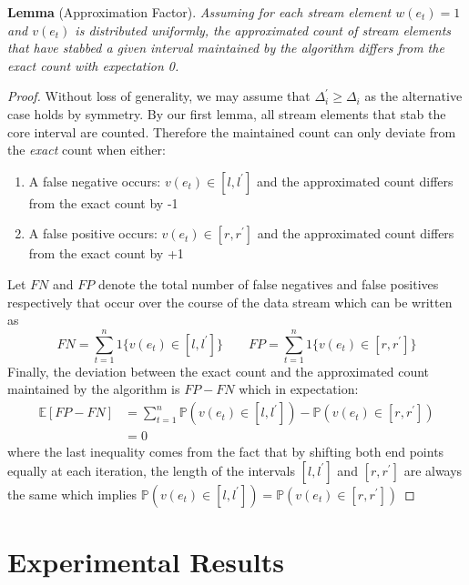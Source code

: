 \textbf{Lemma} (Approximation Factor). \textit{Assuming for each stream element $w(e_t)=1$ and $v(e_t)$ is distributed uniformly, the approximated count of stream elements that have stabbed a given interval maintained by the algorithm differs from the exact count with expectation 0.} 
\\
\begin{proof}
    Without loss of generality, we may assume that $\Delta_i^\prime \geq \Delta_i$ as the alternative case holds by symmetry. 
    By our first lemma, all stream elements that stab the core interval are counted. Therefore the maintained count can only deviate from the \textit{exact} count when either: 
    \begin{enumerate}
        \item A false negative occurs: $v(e_t) \in [l, l^\prime]$ and the approximated count differs from the exact count by -1
        \item A false positive occurs: $v(e_t) \in [r, r^\prime]$ and the approximated count differs from the exact count by +1
    \end{enumerate}
    Let $FN$ and $FP$ denote the total number of false negatives and false positives respectively that occur over the course of the data stream which can be written as
    $$FN = \sum_{t=1}^{n}1\{v(e_t) \in [l, l^\prime]\} \quad \quad FP = \sum_{t=1}^{n}1\{v(e_t) \in [r, r^\prime]\}$$
    Finally, the deviation between the exact count and the approximated count maintained by the algorithm is $FP - FN$ which in expectation:
    \begin{align*}
        \mathbb{E}[FP - FN] &= \sum_{t=1}^{n} \mathbb{P}(v(e_t) \in [l, l^\prime]) - \mathbb{P}(v(e_t) \in [r, r^\prime]) \\
        &= 0
    \end{align*}
    where the last inequality comes from the fact that by shifting both end points equally at each iteration, the length of the intervals $[l, l^\prime]$ and $[r, r^\prime]$ are always the same which implies $\mathbb{P}(v(e_t) \in [l, l^\prime]) = \mathbb{P}(v(e_t) \in [r, r^\prime])$
\end{proof} 

\newpage
\section{Experimental Results}